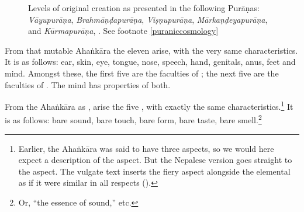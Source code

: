 \begin{translation}
\begin{figure}
              
                \caption{Levels of original creation as presented in the following 
                Purāṇas: \emph{Vāyupurāṇa}, \emph{Brahmāṇḍapurāṇa}, 
                \emph{Viṣṇupurāṇa}, \emph{Mārkaṇḍeyapurāṇa}, 
                and \emph{Kūrmapurāṇa}, \citep[after][27]{biar-1981}. 
                See footnote \ref{puraniccosmology}}
                \label{fig:biardeau1981-p27}
            \end{figure}
            
          
            
            
            From that mutable Ahaṅkāra the 
            eleven  arise, with the very same
            characteristics. It is as follows: ear, skin, eye, tongue, nose,
            speech, hand, genitals, anus, feet and mind.  Amongst these, the first 
            five are the faculties of ; the next five are the 
            faculties of .  The mind has properties of both.
            
            From the Ahaṅkāra as , arise the five ,
with exactly the same characteristics.\footnote{Earlier,
    the Ahaṅkāra was said to have three aspects, so we would
    here expect a description of the 
    aspect.  But the Nepalese version goes straight to the
     aspect.  The vulgate text inserts
    the fiery aspect alongside the elemental as if it were
    similar in all respects ().}  It is as
    follows: bare sound, bare touch, bare form, bare taste,
    bare smell.\footnote{Or, ``the essence of sound,'' etc.}
    

\end{translation}
